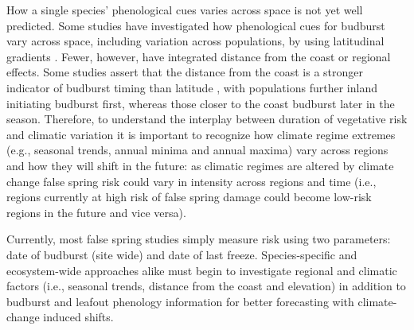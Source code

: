 \documentclass{article}\usepackage[]{graphicx}\usepackage[]{color}
\begin{document}
How a single species' phenological cues varies across space is not yet well predicted. Some studies have investigated how phenological cues for budburst vary across space, including variation across populations, by using latitudinal gradients \citep{Gauzere2017, Sogaard2008, Way2015, Zohner2016}. Fewer, however, have integrated distance from the coast \citep [but see][]{Aitken2015, Harrington2015, Myking2007} or regional effects. Some studies assert that the distance from the coast is a stronger indicator of budburst timing than latitude \citep{Myking2007}, with populations further inland initiating budburst first, whereas those closer to the coast budburst later in the season. Therefore, to understand the interplay between duration of vegetative risk and climatic variation it is important to recognize how climate regime extremes (e.g., seasonal trends, annual minima and annual maxima) vary across regions and how they will shift in the future: as climatic regimes are altered by climate change false spring risk could vary in intensity across regions and time (i.e., regions currently at high risk of false spring damage could become low-risk regions in the future and vice versa). 

Currently, most false spring studies simply measure risk using two parameters: date of budburst (site wide) and date of last freeze. Species-specific and ecosystem-wide approaches alike must begin to investigate regional and climatic factors (i.e., seasonal trends, distance from the coast and elevation) in addition to budburst and leafout phenology information for better forecasting with climate-change induced shifts. 

\end{document}
